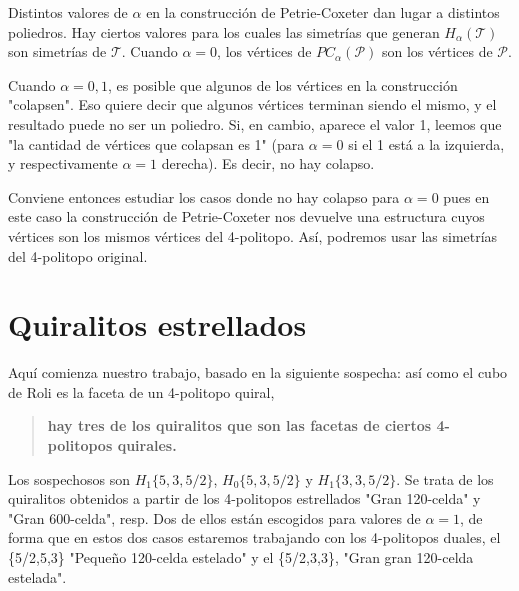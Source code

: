 \documentclass[spanish]{article}
\theoremstyle{definition}
\newtheorem*{teo}{Teorema}
\begin{document}
Distintos valores de $\alpha$ en la construcción de Petrie-Coxeter dan lugar a distintos poliedros. Hay ciertos valores para los cuales las simetrías que generan $H_\alpha(\mathcal{T})$ son simetrías de $\mathcal{T}$. Cuando $\alpha=0$, los vértices de $PC_\alpha(\mathcal{P})$ son los vértices de $\mathcal{P}$.

Cuando $\alpha=0,1$, es posible que algunos de los vértices en la construcción "colapsen". Eso quiere decir que algunos vértices terminan siendo el mismo, y el resultado puede no ser un poliedro. Si, en cambio, aparece el valor 1, leemos que "la cantidad de vértices que colapsan es 1" (para $\alpha=0$ si el 1 está a la izquierda, y respectivamente $\alpha=1$ derecha). Es decir, no hay colapso.

Conviene entonces estudiar los casos donde no hay colapso para $\alpha=0$ pues en este caso la construcción de Petrie-Coxeter nos devuelve una estructura cuyos vértices son los mismos vértices del 4-politopo. Así, podremos usar las simetrías del 4-politopo original.




%
%

\section{Quiralitos estrellados}
Aquí comienza nuestro trabajo, basado en la siguiente sospecha: así como el cubo de Roli es la faceta de un 4-politopo quiral, 

\begin{quote}\textbf{hay tres de los quiralitos que son las facetas de ciertos 4-politopos quirales.}\end{quote}

Los sospechosos son $H_1\{5,3,5/2\}$, $H_0\{5,3,5/2\}$ y $H_1\{3,3,5/2\}$. Se trata de los quiralitos obtenidos a partir de los 4-politopos estrellados "Gran 120-celda" y "Gran 600-celda", resp. Dos de ellos están escogidos para valores de $\alpha=1$, de forma que en estos dos casos estaremos trabajando con los 4-politopos duales, el \{5/2,5,3\} "Pequeño 120-celda estelado" y el \{5/2,3,3\}, "Gran gran 120-celda estelada".
\end{document}
